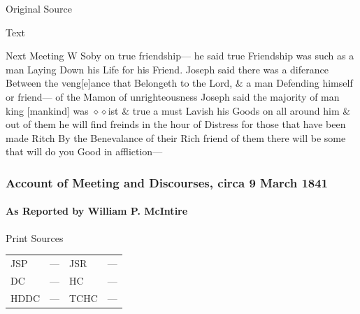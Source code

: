 				\begin{description}
					\item[Original Source]
				\end{description}
				
				
				\begin{description}
					\item[Text]
				\end{description}
				
					Next Meeting W Soby on true friendship--- he said true Friendship was such as a man Laying Down his Life for his Friend. Joseph said there was a diferance Between the veng[e]ance that Belongeth to the Lord, \& a man Defending himself or friend--- of the Mamon of unrighteousness Joseph said the majority of man king [mankind] was $\diamond\diamond$ist \& true a must Lavish his Goods on all around him \& out of them he will find freinds in the hour of Distress for those that have been made Ritch By the Benevalance of their Rich friend of them there will be some that will do you Good in affliction---
					
		\subsubsection{Account of Meeting and Discourses, circa 9 March 1841}
			\label{EMS-1841-JS-CIR-9-MAR-1841}
			
			\paragraph{As Reported by William P. McIntire}
				\label{EMS-1841-JS-CIR-9-MAR-1841-WM}
			
				\begin{description}
					\item[Print Sources]
				\end{description}

				\begin{tabular}{p{0.5in}p{1in}p{0.5in}p{1in}}
					JSP	 	& ---		& JSR 		& --- \\
					DC	 	& ---		& HC 		& --- \\
					HDDC 	& ---		& TCHC 		& --- \\
				\end{tabular}
				
